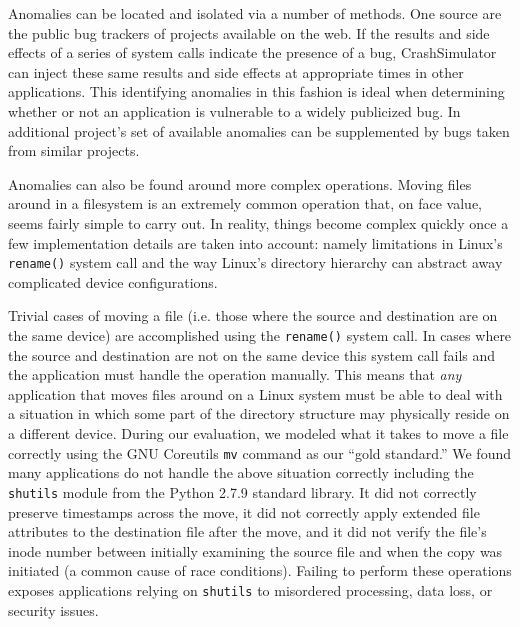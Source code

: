 Anomalies can be located and isolated via a number of methods. One source
are the public bug trackers of projects available on the web. If the
results and side effects of a series of system calls indicate the presence
of a bug,  CrashSimulator can inject these same results and side effects
at appropriate times in other applications.
This identifying anomalies in this fashion is ideal when determining
whether or not an application is vulnerable to a widely publicized bug. In
additional project’s set of available anomalies can be supplemented by bugs
taken from similar projects.

Anomalies can also be found around more complex operations.  Moving files
around in a filesystem is an extremely common operation that, on face
value, seems fairly simple to carry out.  In reality, things become
complex quickly once a few implementation details are taken into account:
namely limitations in Linux's {\tt rename()} system call and the way
Linux's directory hierarchy can abstract away complicated device
configurations.


Trivial cases of moving a file (i.e. those where the source and destination
are on the same device) are accomplished using the {\tt rename()} system
call.  In cases where the source and destination are not on the same device
this system call fails and the application must handle the operation
manually. This means that \emph{any} application that moves files around on
a Linux system must be able to deal with a situation in which some part of
the directory structure may physically reside on a different device.
During our evaluation, we modeled what it takes to move a file correctly
using the GNU Coreutils {\tt mv} command as our ``gold standard.''  We
found many applications do not handle the above situation correctly
including the {\tt shutils} module from the Python 2.7.9 standard library.
It did not correctly preserve timestamps across the move, it did not
correctly apply extended file attributes to the destination file after the
move, and it did not verify the file's inode number between initially
examining the source file and when the copy was initiated (a common cause
of race conditions).  Failing to perform these operations exposes
applications relying on {\tt shutils} to misordered processing, data loss,
or security issues.

